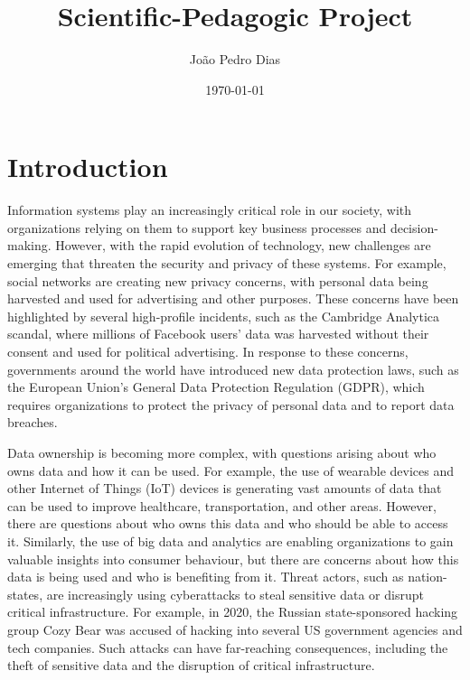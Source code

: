 \documentclass[11pt]{article}
\title{Scientific-Pedagogic Project}
\author{João Pedro Dias}
\date{\today}
\begin{document}
\maketitle	
\thispagestyle{empty}
\pagebreak



\section{Introduction}

Information systems play an increasingly critical role in our society, with organizations relying on them to support key business processes and decision-making. However, with the rapid evolution of technology, new challenges are emerging that threaten the security and privacy of these systems. For example, social networks are creating new privacy concerns, with personal data being harvested and used for advertising and other purposes. These concerns have been highlighted by several high-profile incidents, such as the Cambridge Analytica scandal, where millions of Facebook users' data was harvested without their consent and used for political advertising. In response to these concerns, governments around the world have introduced new data protection laws, such as the European Union's General Data Protection Regulation (GDPR), which requires organizations to protect the privacy of personal data and to report data breaches.

Data ownership is becoming more complex, with questions arising about who owns data and how it can be used. For example, the use of wearable devices and other Internet of Things (IoT) devices is generating vast amounts of data that can be used to improve healthcare, transportation, and other areas. However, there are questions about who owns this data and who should be able to access it. Similarly, the use of big data and analytics are enabling organizations to gain valuable insights into consumer behaviour, but there are concerns about how this data is being used and who is benefiting from it.
Threat actors, such as nation-states, are increasingly using cyberattacks to steal sensitive data or disrupt critical infrastructure. For example, in 2020, the Russian state-sponsored hacking group Cozy Bear was accused of hacking into several US government agencies and tech companies. Such attacks can have far-reaching consequences, including the theft of sensitive data and the disruption of critical infrastructure.
\end{document}
